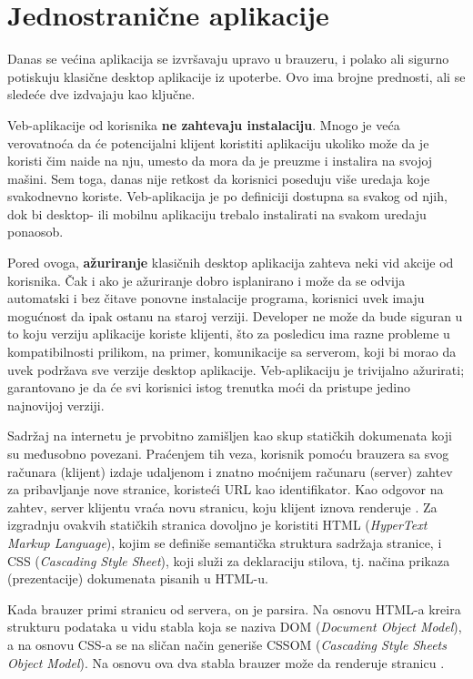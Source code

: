 \section{Jednostranične aplikacije}

Danas se većina aplikacija se izvršavaju upravo u brauzeru, i polako ali sigurno potiskuju klasične desktop aplikacije iz upoterbe.
Ovo ima brojne prednosti, ali se sledeće dve izdvajaju kao ključne.

Veb-aplikacije od korisnika \textbf{ne zahtevaju instalaciju}.
Mnogo je veća verovatnoća da će potencijalni klijent koristiti aplikaciju ukoliko može da je koristi čim naide na nju, umesto da mora da je preuzme i instalira na svojoj mašini.
Sem toga, danas nije retkost da korisnici poseduju više uredaja koje svakodnevno koriste.
Veb-aplikacija je po definiciji dostupna sa svakog od njih, dok bi desktop- ili mobilnu aplikaciju trebalo instalirati na svakom uredaju ponaosob.

Pored ovoga, \textbf{ažuriranje} klasičnih desktop aplikacija zahteva neki vid akcije od korisnika.
Čak i ako je ažuriranje dobro isplanirano i može da se odvija automatski i bez čitave ponovne instalacije programa, korisnici uvek imaju mogućnost da ipak ostanu na staroj verziji.
Developer ne može da bude siguran u to koju verziju aplikacije koriste klijenti, što za posledicu ima razne probleme u kompatibilnosti prilikom, na primer, komunikacije sa serverom, koji bi morao da uvek podržava sve verzije desktop aplikacije.
Veb-aplikaciju je trivijalno ažurirati; garantovano je da će svi korisnici istog trenutka moći da pristupe jedino najnovijoj verziji.

Sadržaj na internetu je prvobitno zamišljen kao skup statičkih dokumenata koji su međusobno povezani.
Praćenjem tih veza, korisnik pomoću brauzera sa svog računara (klijent) izdaje udaljenom i znatno moćnijem računaru (server) zahtev za pribavljanje nove stranice, koristeći URL kao identifikator.
Kao odgovor na zahtev, server klijentu vraća novu stranicu, koju klijent iznova renderuje \cite{lee:answers-for-young-people}.
Za izgradnju ovakvih statičkih stranica dovoljno je koristiti HTML (\textsl{HyperText Markup Language}), kojim se definiše semantička struktura sadržaja stranice, i CSS (\textsl{Cascading Style Sheet}), koji služi za deklaraciju stilova, tj. načina prikaza (prezentacije) dokumenata pisanih u HTML-u.

Kada brauzer primi stranicu od servera, on je parsira.
Na osnovu HTML-a kreira strukturu podataka u vidu stabla koja se naziva DOM (\textsl{Document Object Model}), a na osnovu CSS-a se na sličan način generiše CSSOM (\textsl{Cascading Style Sheets Object Model}).
Na osnovu ova dva stabla brauzer može da renderuje stranicu \cite{mdn:getting-started-with-the-web}.

